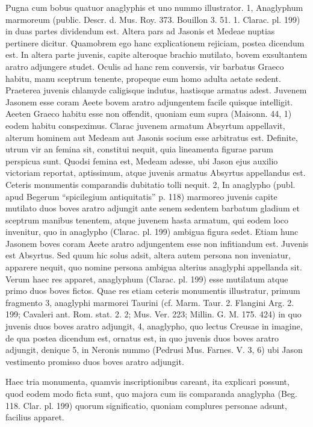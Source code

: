 \documentclass[a4paper, 11pt, oneside, polutonikogreek, german]{article}
\begin{document}
Pugna cum bobus quatuor anaglyphis et uno nummo illustrator. 1, Anaglyphum marmoreum (public. Descr. d. Mus. Roy. 373. Bouillon 3. 51. 1. Clarac. pl. 199) in duas partes dividendum est. Altera pars ad Jasonis et Medeae nuptias pertinere dicitur. Quamobrem ego hanc explicationem rejiciam, postea dicendum est. In altera parte juvenis, capite alteroque brachio mutilato, bovem exsultantem aratro adjungere studet. Oculis ad hanc rem conversis, vir barbatus Graeco habitu, manu sceptrum tenente, propeque eum homo adulta aetate sedent. Praeterea juvenis chlamyde caligisque indutus, hastisque armatus adest. Juvenem Jasonem esse coram Aeete bovem aratro adjungentem facile quisque intelligit. Aeeten Graeco habitu esse non offendit, quoniam eum supra (Maisonn. 44, 1) eodem habitu conspeximus. Clarac juvenem armatum Absyrtum appellavit, alterum hominem aut Medeam aut Jasonis socium esse arbitratus est. Definite, utrum vir an femina sit, constitui nequit, quia lineamenta figurae parum perspicua sunt. Quodsi femina est, Medeam adesse, ubi Jason ejus auxilio victoriam reportat, aptissimum, atque juvenis armatus Absyrtus appellandus est. Ceteris monumentis comparandis dubitatio tolli nequit. 2, In anaglypho (publ. apud Begerum "`spicilegium antiquitatis"' p. 118) marmoreo juvenis capite mutilato duos boves aratro adjungit ante senem sedentem barbatum gladium et sceptrum manibus tenentem, atque juvenem hasta armatum, qui eodem loco invenitur, quo in anaglypho (Clarac. pl. 199) ambigua figura sedet. Etiam hunc Jasonem boves coram Aeete aratro adjungentem esse non infitiandum est. Juvenis est Absyrtus. Sed quum hic solus adsit, altera autem persona non inveniatur, apparere nequit, quo nomine persona ambigua alterius anaglyphi appellanda sit. Verum haec res apparet, anaglyphum (Clarac. pl. 199) esse mutilatum atque primo duos boves fictos. Quae res etiam ceteris monumentis illustratur, primum fragmento 3, anaglyphi marmorei Taurini (cf. Marm. Taur. 2. Flangini Arg. 2. 199; Cavaleri ant. Rom. stat. 2. 2; Mus. Ver. 223; Millin. G. M. 175. 424) in quo juvenis duos boves aratro adjungit, 4, anaglypho, quo lectus Creusae in imagine, de qua postea dicendum est, ornatus est, in quo juvenis duos boves aratro adjungit, denique 5, in Neronis nummo (Pedrusi Mus. Farnes. V. 3, 6) ubi Jason vestimento promisso duos boves aratro adjungit.

Haec tria monumenta, quamvis inscriptionibus careant, ita explicari possunt, quod eodem modo ficta sunt, quo majora cum iis comparanda anaglypha (Beg. 118. Clar. pl. 199) quorum significatio, quoniam complures personae adsunt, facilius apparet.
\end{document}
